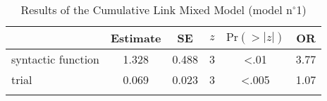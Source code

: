 \begin{table}
\begin{tabular}{l S[table-format=1.3] S[table-format=1.3] c S[table-format=<1.3] S[table-format=1.2]}
  \lsptoprule
                     & {Estimate} & {SE} & {$z$} & {$\text{Pr}(>|z|)$} & {OR} \\ 
  \midrule
  syntactic function & 1.328 & 0.488 & 3 & <.01 & 3.77 \\ 
  trial              & 0.069 & 0.023 & 3 & <.005 & 1.07 \\ 
 \lspbottomrule
\end{tabular}
\caption{Results of the Cumulative Link Mixed Model (model n$^{\circ}$1)}
\label{tab:exp16-m1}
\end{table}
